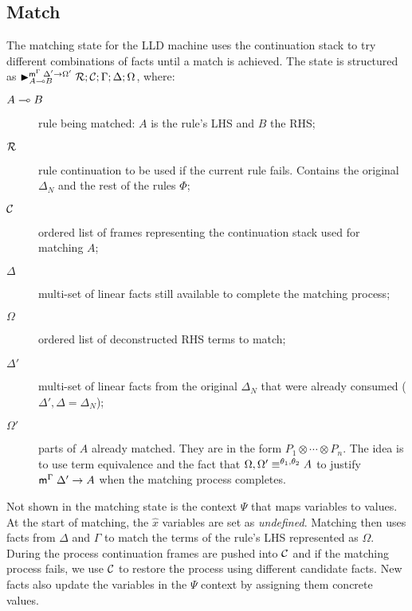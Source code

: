 \subsection{Match}\label{sec:lld_body_match}

The matching state for the LLD machine uses the continuation stack to try
different combinations of facts until a match is achieved.  The state is
structured as $\matstate{A \lolli
   B}{\rulestk}{\lstack{C}}{\Gamma}{\Delta}{\Omega}{\Delta' \rightarrow
      \Omega'}$, where:

\begin{description}
   \item[$A \lolli B$] rule being matched: $A$ is the rule's LHS and $B$ the RHS;

   \item[$\rulestk$] rule continuation to be used if the current rule fails.
   Contains the original $\Delta_N$ and the rest of the rules $\Phi$;

   \item[$\lstack{C}$] ordered list of frames representing the continuation
   stack used for matching $A$;

   \item[$\Delta$] multi-set of linear facts still available to complete the
   matching process;

   \item[$\Omega$] ordered list of deconstructed RHS terms to match;

   \item[$\Delta'$] multi-set of linear facts from the original $\Delta_N$ that
   were already consumed ($\Delta', \Delta = \Delta_N$);

   \item[$\Omega'$] parts of $A$ already matched. They are in the form $P_1
   \otimes \dotsb \otimes P_n$. The idea is to use term equivalence and the fact
   that $\feq{\Omega, \Omega'}{A}$ to justify $\mz{\Gamma}{\Delta'}{A}$ when the
   matching process completes.

\end{description}

Not shown in the matching state is the context $\Psi$ that maps variables to
values. At the start of matching, the $\widehat{x}$ variables are set as
\emph{undefined}. Matching then uses facts from $\Delta$ and $\Gamma$ to match
the terms of the rule's LHS represented as $\Omega$. During the process
continuation frames are pushed into $\lstack{C}$ and if the matching process
fails, we use $\lstack{C}$ to restore the process using different candidate
facts. New facts also update the variables in the $\Psi$ context by assigning
them concrete values.

